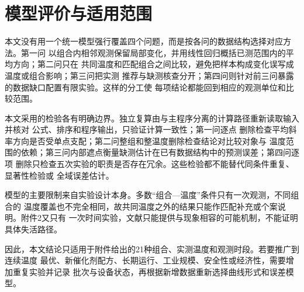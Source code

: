 \section{模型评价与适用范围}\label{sec:evaluation}

本文没有用一个统一模型强行覆盖四个问题，而是按各问的数据结构选择对应方法。第一问
以组合内相邻观测保留局部变化，并用线性回归概括已测范围内的平均方向；第二问只在
共同温度和匹配组合之间比较，避免把样本构成变化误写成温度或组合影响；第三问把实测
推荐与缺测核查分开；第四问则针对前三问暴露的数据缺口配置有限实验。这样的分工使
每项结论都能回到相应的观测单位和比较范围。

本文采用的检验各有明确边界。独立复算由与主程序分离的计算路径重新读取输入并核对
公式、排序和程序输出，只验证计算一致性；第一问逐点
删除检查平均斜率方向是否受单点支配；第二问整组和整温度删除检查结论对比较对象与
温度范围的依赖；第三问内部遮点衡量缺测估计在已有数据结构中的预测误差；第四问逐项
删除只检查五次实验的职责是否存在冗余。这些检验都不能替代同条件重复、显著性检验或
全域误差估计。

模型的主要限制来自实验设计本身。多数“组合—温度”条件只有一次观测，不同组合的
温度覆盖也不完全相同，故共同温度之外的结果只能作匹配补充或个案说明。附件2又只有
一次时间实验，文献只能提供与现象相容的可能机制，不能证明具体失活路径。

因此，本文结论只适用于附件给出的21种组合、实测温度和观测时段。若要推广到连续温度
最优、新催化剂配方、长期运行、工业规模、安全性或经济性，需要增加重复实验并记录
批次与设备状态，再根据新增数据重新选择曲线形式和误差模型。

